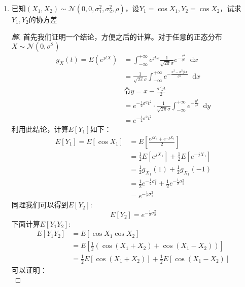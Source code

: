 \documentclass[12pt]{article}
\newcommand{\hei}{\CJKfamily{hei}}                          %
\newcommand*{\dif}{\mathop{}\!\mathrm{d}}
\begin{document}
\begin{enumerate}
\item {\hei 已知$(X_1,X_2)\sim \mathcal{N}(0,0,\sigma_1^2,\sigma_2^2,\rho)$，设$Y_1=\cos X_1,Y_2=\cos X_2$，试求$Y_1,Y_2$的协方差}
\begin{proof}[解]
	首先我们证明一个结论，方便之后的计算。对于任意的正态分布$X\sim\mathcal{N}(0,\sigma^2)$
	\begin{equation}
	\begin{aligned}
		g_X(t)=E(e^{jtX})&=\int_{-\infty}^{+\infty}e^{jtx}\frac{1}{\sqrt{2\pi}\sigma}e^{-\frac{x^2}{\sigma^2}}\dif x \\
		&=\frac{1}{\sqrt{2\pi}\sigma}\int_{-\infty}^{+\infty}e^{-\frac{x^2-\sigma^2jtx}{\sigma^2}}\dif x \\
		&\mbox{令}y=x-\frac{\sigma^2jt}{2} \\
		&=e^{-\frac{1}{2}\sigma^2t^2}\cdot\frac{1}{\sqrt{2\pi}\sigma}\int_{-\infty}^{+\infty}e^{-\frac{y^2}{\sigma^2}}\dif y \\
		&=e^{-\frac{1}{2}\sigma^2t^2}
	\end{aligned}
	\end{equation}
	利用此结论，计算$E[Y_1]$如下：
	\begin{equation}
	\label{eq1}
	\begin{aligned}
	E[Y_1]=E[\cos X_1]&=E\left[\frac{e^{jX_1}+e^{-jX_1}}{2}\right] \\
	&=\frac{1}{2}E\left[e^{jX_1}\right]+\frac{1}{2}E\left[e^{-jX_1}\right] \\
	&=\frac{1}{2}g_{X_1}(1)+\frac{1}{2}g_{X_1}(-1) \\
	&=\frac{1}{2}e^{-\frac{1}{2}\sigma_1^2}+\frac{1}{2}e^{-\frac{1}{2}\sigma_1^2} \\
	&=e^{-\frac{1}{2}\sigma_1^2}
	\end{aligned}
	\end{equation}
	同理我们可以得到$E[Y_2]$:
	\begin{equation}
	E[Y_2]=e^{-\frac{1}{2}\sigma_2^2}
	\end{equation}
	下面计算$E[Y_1Y_2]$:
	\begin{equation}
	\label{eq2}
	\begin{aligned}
	E[Y_1Y_2]&=E[\cos X_1\cos X_2] \\
	&=E\left[\frac{1}{2}\left(\cos(X_1+X_2)+\cos(X_1-X_2)\right)\right] \\
	&=\frac{1}{2}E\left[\cos(X_1+X_2)\right]+\frac{1}{2}E\left[\cos(X_1-X_2)\right]
	\end{aligned}
	\end{equation}
	可以证明：
	\begin{equation}

\end{equation}
\end{proof}
\end{enumerate}
\end{document}
